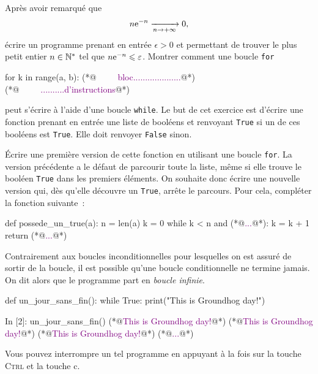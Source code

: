 \documentclass{magnoliaold}
\begin{document}
\begin{exos}
\exo Après avoir remarqué que
  \[n {\rm e}^{-n}\xrightarrow[n\rightarrow +\infty]{}0,\]
  écrire un programme prenant en entrée $\epsilon>0$ et permettant de trouver le plus petit entier $n\in{\mathbb{N}^*}$ tel que
  $n {\rm e}^{-n} \leqslant \varepsilon$.
\exo Montrer comment une boucle \verb_for_
\begin{pythoncode}
for k in range(a, b):
(*@\textcolor{purple}{\ \ \ \ \ bloc....................}@*)
(*@\textcolor{purple}{\ \ \ \ \ ..........d'instructions}@*)
\end{pythoncode}
peut s'écrire à l'aide d'une boucle \verb_while_.
\exo Le but de cet exercice est d'écrire une fonction prenant en entrée une liste de
  booléens et renvoyant \verb!True!
  si un de ces booléens est \verb_True_. Elle doit renvoyer \verb!False! sinon.
  \begin{questions}
  \question Écrire une première version de cette fonction en utilisant une boucle \verb!for!.
  \question La version précédente a le défaut de parcourir toute la liste, même si elle
    trouve le booléen \verb!True! dans les premiers éléments. On souhaite
    donc écrire une nouvelle version qui, dès qu'elle découvre un \verb!True!,
    arrête le parcours. Pour cela, compléter la fonction suivante~:
\begin{pythoncodeline}
def possede_un_true(a):
    n = len(a)
    k = 0
    while k < n and (*@\textcolor{purple}{...}@*):
        k = k + 1
    return (*@\textcolor{purple}{...}@*)
\end{pythoncodeline}
  \end{questions}
\end{exos}
\vspace{2ex}
Contrairement aux boucles inconditionnelles pour lesquelles on est assuré
de sortir de la boucle, il est possible qu'une boucle conditionnelle ne termine jamais.
On dit alors que le programme part en \emph{boucle infinie}. 

\begin{pythoncodeline}
def un_jour_sans_fin():
    while True:
        print("This is Groundhog day!")
\end{pythoncodeline}

\begin{pythoncode}
In [2]: un_jour_sans_fin()
(*@\textcolor{purple}{This is Groundhog day!}@*)
(*@\textcolor{purple}{This is Groundhog day!}@*)
(*@\textcolor{purple}{This is Groundhog day!}@*)
(*@\textcolor{purple}{...}@*)
\end{pythoncode}
\noindent Vous pouvez interrompre un tel programme en appuyant à la fois sur la touche \og \textsc{Ctrl} \fg et la touche \og c\fg.\\
\end{document}
